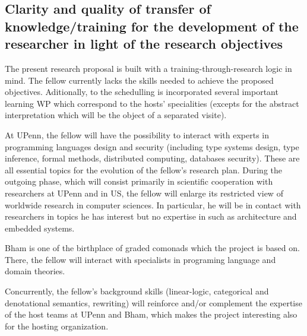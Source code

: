 \documentclass{article}[11pt]
\begin{document}
%
%

\subsection{Clarity and quality of transfer of knowledge/training for the development of the researcher in light of the research objectives}
The present research proposal is built with a training-through-research logic in mind. The fellow currently lacks the
skills needed to achieve the proposed objectives. Aditionally, to the schedulling is incorporated several important learning WP which 
correspond to the hosts' specialities (excepts for the abstract interpretation which will be the object of a separated visite).

At UPenn, the fellow will have the possibility to
interact with experts in programming languages design and security (including type systems design, type inference, formal methods, 
distributed computing, databases security). These are all essential topics for the evolution of the fellow’s research plan. 
During the outgoing phase, which will consist primarily in scientific cooperation with researchers at UPenn and in US, the
fellow will enlarge its restricted view of worldwide research in computer sciences. In particular, he will be in contact with
researchers in topics he has interest but no expertise in such as architecture and embedded systems.

Bham is  one of the birthplace of graded comonads which the project is based on. There, the fellow will interact with specialists 
in programing language and domain theories.

Concurrently, the fellow’s background skills (linear-logic, categorical and denotational semantics, rewriting) 
will reinforce and/or complement the expertise of the host teams at UPenn and Bham, which makes the project
interesting also for the hosting organization.
\end{document}
